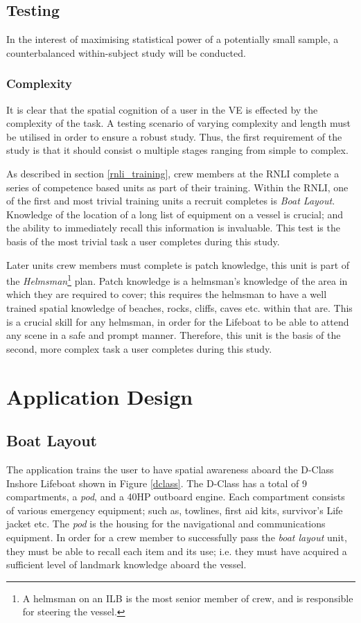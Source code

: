 \documentclass[a4paper, openright, twoside]{book}
\begin{document}
\subsection{Testing}
In the interest of maximising statistical power of a potentially small sample, a counterbalanced within-subject study will be conducted. 

\subsubsection{Complexity}
It is clear that the spatial cognition of a user in the VE is effected by the complexity of the task. A testing scenario of varying complexity and length must be utilised in order to ensure a robust study. Thus, the first requirement of the study is that it should consist o multiple stages ranging from simple to complex. 

As described in section \ref{rnli_training}, crew members at the RNLI complete a series of competence based units as part of their training.  Within the RNLI, one of the first and most trivial training units a recruit completes is \textit{Boat Layout}. Knowledge of the location of a long list of equipment on a vessel is crucial; and the ability to immediately recall this information is invaluable. This test is the basis of the most trivial task a user completes during this study. 

Later units crew members must complete is patch knowledge, this unit is part of the \textit{Helmsman}\footnote{A helmsman on an ILB is the most senior member of crew, and is responsible for steering the vessel.} plan. Patch knowledge is a helmsman's knowledge of the area in which they are required to cover; this requires the helmsman to have a well trained spatial knowledge of beaches, rocks, cliffs, caves etc. within that are. This is a crucial skill for any helmsman, in order for the Lifeboat to be able to attend any scene in a safe and prompt manner. Therefore, this unit is the basis of the second, more complex task a user completes during this study. 

\section{Application Design}
\subsection{Boat Layout}
The application trains the user to have spatial awareness aboard the D-Class Inshore Lifeboat shown in Figure \ref{dclass}. The D-Class has a total of 9 compartments, a \textit{pod}, and a 40HP outboard engine. Each compartment consists of various emergency equipment; such as, towlines, first aid kits, survivor's Life jacket etc. The \textit{pod} is the housing for the navigational and communications equipment. In order for a crew member to successfully pass the \textit{boat layout} unit, they must be able to recall each item and its use; i.e. they must have acquired a sufficient level of landmark knowledge aboard the vessel. 
\end{document}

